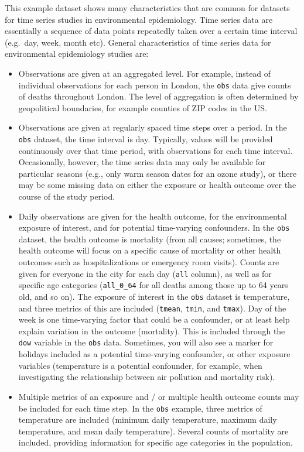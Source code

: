 \documentclass[
]{book}
\providecommand{\tightlist}{%
  \setlength{\itemsep}{0pt}\setlength{\parskip}{0pt}}
\begin{document}
This example dataset shows many characteristics that are common for datasets for
time series studies in environmental epidemiology. Time series data are essentially
a sequence of data points repeatedly taken over a certain time interval (e.g.~day,
week, month etc). General characteristics of time series data for environmental epidemiology studies are:

\begin{itemize}
\tightlist
\item
  Observations are given at an aggregated level. For example, instead of
  individual observations for each person in London, the \texttt{obs} data give
  counts of deaths throughout London. The level of aggregation is often determined
  by geopolitical boundaries, for example counties of ZIP codes in the US.
\item
  Observations are given at regularly spaced time steps over a period. In the
  \texttt{obs} dataset, the time interval is day. Typically, values will be provided
  continuously over that time period, with observations for each time interval.
  Occasionally, however, the time series data may only be available for
  particular seasons (e.g., only warm season dates for an ozone study), or
  there may be some missing data on either the exposure or health outcome over
  the course of the study period.
\item
  Daily observations are given for the health outcome, for the environmental
  exposure of interest, and for potential time-varying confounders. In the \texttt{obs}
  dataset, the health outcome is mortality (from all causes; sometimes, the health
  outcome will focus on a specific cause of mortality or other health outcomes such
  as hospitalizations or emergency room visits). Counts are given for everyone in
  the city for each day (\texttt{all} column), as well as for specific age categories
  (\texttt{all\_0\_64} for all deaths among those up to 64 years old, and so on). The
  exposure of interest in the \texttt{obs} dataset is temperature, and three metrics of
  this are included (\texttt{tmean}, \texttt{tmin}, and \texttt{tmax}). Day of the week is one
  time-varying factor that could be a confounder, or at least help explain
  variation in the outcome (mortality). This is included through the \texttt{dow} variable
  in the \texttt{obs} data. Sometimes, you will also see a marker for holidays included
  as a potential time-varying confounder, or other exposure variables (temperature
  is a potential confounder, for example, when investigating the relationship
  between air pollution and mortality risk).
\item
  Multiple metrics of an exposure and / or multiple health outcome counts
  may be included for each time step. In the \texttt{obs} example, three metrics of
  temperature are included (minimum daily temperature, maximum daily temperature,
  and mean daily temperature). Several counts of mortality are included, providing
  information for specific age categories in the population.
\end{itemize}
\end{document}

